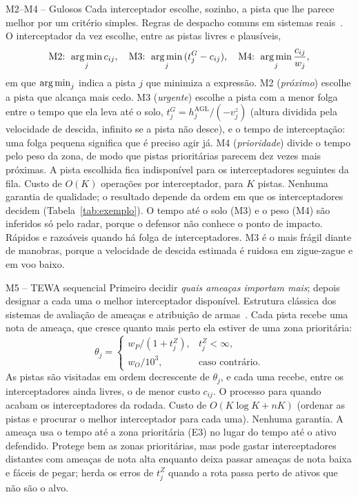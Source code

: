 \begin{metodo}{M2--M4 -- Gulosos}
\ideia Cada interceptador escolhe, sozinho, a pista que lhe parece melhor por um critério simples.
\orig Regras de despacho comuns em sistemas reais~\cite{roux2007,kline2019}.
\func O interceptador da vez escolhe, entre as pistas livres e plausíveis,
\begin{equation}
  \text{M2: }\operatorname*{arg\,min}_j c_{ij},\quad
  \text{M3: }\operatorname*{arg\,min}_j\,(t^G_j-c_{ij}),\quad
  \text{M4: }\operatorname*{arg\,min}_j \frac{c_{ij}}{w_j},
\end{equation}
em que $\operatorname*{arg\,min}_j$ indica a pista $j$ que minimiza a expressão. M2 (\emph{próximo}) escolhe a pista que alcança mais
cedo. M3 (\emph{urgente}) escolhe a pista com a menor folga entre o tempo que ela leva até o solo,
$t^G_j=h_j^{\mathrm{AGL}}/(-v_j^z)$ (altura dividida pela velocidade de descida, infinito se a pista não desce), e o tempo de
interceptação: uma folga pequena significa que é preciso agir já. M4 (\emph{prioridade}) divide o tempo pelo peso da zona,
de modo que pistas prioritárias parecem dez vezes mais próximas. A pista escolhida fica indisponível para os
interceptadores seguintes da fila.
\prop Custo de $O(K)$ operações por interceptador, para $K$ pistas. Nenhuma garantia de qualidade; o resultado depende da
ordem em que os interceptadores decidem (Tabela~\ref{tab:exemplo}).
\adap O tempo até o solo (M3) e o peso (M4) são inferidos só pelo radar, porque o defensor não conhece o ponto de impacto.
\espera Rápidos e razoáveis quando há folga de interceptadores. M3 é o mais frágil diante de manobras, porque a velocidade
de descida estimada é ruidosa em zigue-zague e em voo baixo.
\end{metodo}

\begin{metodo}{M5 -- TEWA sequencial}
\ideia Primeiro decidir \emph{quais ameaças importam mais}; depois designar a cada uma o melhor interceptador disponível.
\orig Estrutura clássica dos sistemas de avaliação de ameaças e atribuição de armas~\cite{roux2007}.
\func Cada pista recebe uma nota de ameaça, que cresce quanto mais perto ela estiver de uma zona prioritária:
\begin{equation}
  \theta_j=\begin{cases} w_P/(1+t^Z_j), & t^Z_j<\infty,\\ w_O/10^3, & \text{caso contrário.}\end{cases}
\end{equation}
As pistas são visitadas em ordem decrescente de $\theta_j$, e cada uma recebe, entre os interceptadores ainda livres, o
de menor custo $c_{ij}$. O processo para quando acabam os interceptadores da rodada.
\prop Custo de $O(K\log K+nK)$ (ordenar as pistas e procurar o melhor interceptador para cada uma). Nenhuma garantia.
\adap A ameaça usa o tempo até a zona prioritária (E3) no lugar do tempo até o ativo defendido.
\espera Protege bem as zonas prioritárias, mas pode gastar interceptadores distantes com ameaças de nota alta enquanto
deixa passar ameaças de nota baixa e fáceis de pegar; herda os erros de $t^Z_j$ quando a rota passa perto de ativos
que não são o alvo.
\end{metodo}

